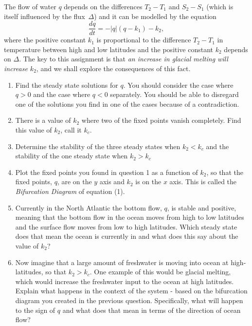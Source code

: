 \documentclass[10pt, letterpaper, answer]{exam}
\begin{document}
The flow of water $q$ depends on the differences $T_2 - T_1$ and $S_2 - S_1$ (which is itself influenced by the flux~$\Delta$) and it can be modelled by the equation
\begin{equation}
    \frac{dq}{dt} = -|q|(q - k_1) - k_2,
\end{equation}
where the positive constant $k_1$ is proportional to the difference $T_2 - T_1$ in temperature between high and low latitudes and the positive constant $k_2$ depends on $\Delta$. The key to this assignment is that \emph{an increase in glacial melting will increase $k_2$}, and we shall explore the consequences of this fact.
\begin{enumerate}
    \item Find the steady state solutions for $q$. You should consider the case where $q>0$ and the case where $q<0$ separately.  You should be able to disregard one of the solutions you find in one of the cases because of a contradiction. 
   
    \item There is a value of $k_2$ where two of the fixed points vanish completely. Find this value of $k_2$, call it $k_c$.  
  \\


    \item Determine the stability of the three steady states when $k_2<k_c$ and the stability of the one steady state when $k_2>k_c$

  


\item Plot the fixed points you found in question 1 as a function of $k_2$, so that the fixed points, $q$, are on the $y$ axis and $k_2$ is on the $x$ axis. This is called the \textit{Bifurcation Diagram} of equation (1).




\item Currently in the North Atlantic the bottom flow, $q$, is stable and positive, meaning that the bottom flow in the ocean moves from high to low latitudes and the surface flow moves from low to high latitudes. Which steady state does that mean the ocean is currently in and what does this say about the value of $k_2$?



\item Now imagine that a large amount of freshwater is moving into ocean at high-latitudes, so that $k_2>k_c$.  One example of this would be glacial melting, which would increase the freshwater input to the ocean at high latitudes.
\\
Explain what happens in the context of the system - based on the bifurcation diagram you created in the previous question. Specifically, what will happen to the sign of $q$ and what does that mean in terms of the direction of ocean flow?

 
\end{enumerate}
\end{document}
